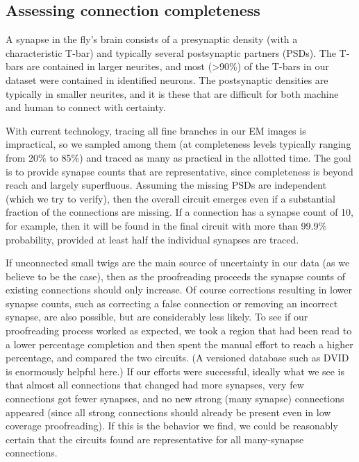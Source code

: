 \documentclass{article}
\begin{document}
\subsection*{Assessing connection completeness}

A synapse in the fly’s brain consists of a presynaptic density (with a characteristic T-bar) and typically several postsynaptic partners (PSDs). The T-bars are contained in larger neurites, and most (>90\%) of the T-bars in our dataset were contained in identified neurons. The postsynaptic densities are typically in smaller neurites, and it is these that are difficult for both machine and human to connect with certainty.

With current technology, tracing all fine branches in our EM images is impractical, so we sampled among them (at completeness levels typically ranging from 20\% to 85\%) and traced as many as practical in the allotted time. The goal is to provide synapse counts that are representative, since completeness is beyond reach and largely superfluous. Assuming the missing PSDs are independent (which we try to verify), then the overall circuit emerges even if a substantial fraction of the connections are missing. If a connection has a synapse count of 10, for example, then it will be found in the final circuit with more than 99.9\% probability, provided at least half the individual synapses are traced.

If unconnected small twigs are the main source of uncertainty in our data (as we believe to be the case), then as the proofreading proceeds the synapse counts of existing connections should only increase. Of course corrections resulting in lower synapse counts, such as correcting a false connection or removing an incorrect synapse, are also possible, but are considerably less likely. To see if our proofreading process worked as expected, we took a region that had been read to a lower percentage completion and then spent the manual effort to reach a higher percentage, and compared the two circuits. (A versioned database such as DVID is enormously helpful here.) If our efforts were successful, ideally what we see is that almost all connections that changed had more synapses, very few connections got fewer synapses, and no new strong (many synapse) connections appeared (since all strong connections should already be present even in low coverage proofreading). If this is the behavior we find, we could be reasonably certain that the circuits found are representative for all many-synapse connections.
\end{document}
